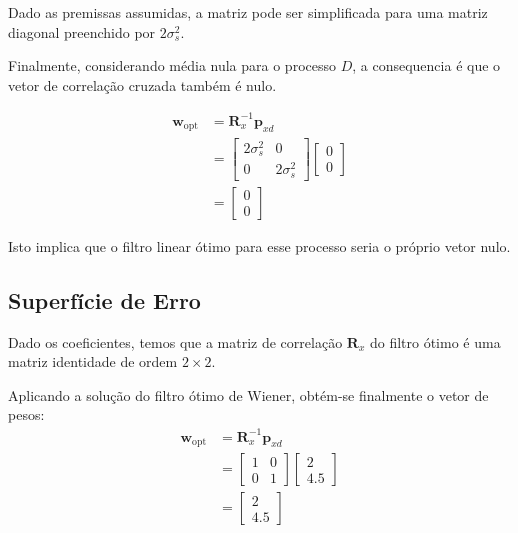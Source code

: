 Dado as premissas assumidas, a matriz pode ser simplificada para uma matriz diagonal preenchido por $2 \sigma^{2}_{s}$.

Finalmente, considerando média nula para o processo $D$, a consequencia é que o vetor de correlação cruzada também é nulo.


\begin{align*} 
    \mathbf{w}_{\text{opt}} &= \mathbf{R}^{-1}_{x} \mathbf{p}_{xd} \\
    & = 
    \begin{bmatrix}
        2 \sigma^{2}_{s} & 0 \\
        0  & 2 \sigma^{2}_{s}
    \end{bmatrix}
    \begin{bmatrix}
        0 \\
        0 
    \end{bmatrix} \\
    &= 
    \begin{bmatrix}
        0 \\
        0 
    \end{bmatrix}
\end{align*}

Isto implica que o filtro linear ótimo para esse processo seria o próprio vetor nulo.


\subsection{Superfície de Erro} %

Dado os coeficientes, temos que a matriz de correlação $\mathbf{R}_{x}$ do filtro ótimo é uma matriz identidade de ordem $2 \times 2$.

Aplicando a solução do filtro ótimo de Wiener, obtém-se finalmente o vetor de pesos:
\begin{align*}
    \mathbf{w}_{\text{opt}} &= \mathbf{R}^{-1}_{x} \mathbf{p}_{xd} \\
    &= \left[ \begin{matrix} 1 & 0 \\ 0 & 1 \end{matrix} \right]  \left[ \begin{matrix} 2 \\ 4.5 \end{matrix} \right] \\
    &= \left[ \begin{matrix} 2 \\ 4.5 \end{matrix} \right]
\end{align*}


